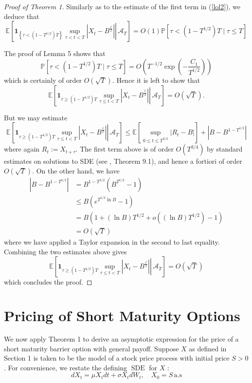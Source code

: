 \documentclass{article}
\theoremstyle{definition}
\theoremstyle{definition}
\begin{document}
\begin{proof}[Proof of Theorem 1]
Similarly as to the estimate of the first term in (\ref{lol2}), we deduce that
$$
\mathbb{E}\left[\left.\mathbf{1}_{\left\{\tau<\left(1-T^{1 / 2}\right) T\right\}} \sup _{\tau<t<T}\left|X_{t}-B^{\frac{t}{T}}\right| \right\rvert\, \mathcal{A}_{T}\right]=O(1) \mathbb{P}\left[\tau<\left(1-T^{1 / 2}\right) T \mid \tau \leq T\right]
$$

The proof of Lemma 5 shows that
$$
\mathbb{P}\left[\tau<\left(1-T^{1 / 2}\right) T \mid \tau \leq T\right]=O\left(T^{-1 / 2} \exp \left(-\frac{C_{1}}{T^{1 / 2}}\right)\right)
$$
which is certainly of order $O(\sqrt{T})$. Hence it is left to show that
$$
\mathbb{E}\left[\left.\mathbf{1}_{\tau \geq\left(1-T^{1 / 2}\right) T} \sup _{\tau \leq t<T}\left|X_{t}-B^{\frac{t}{T}}\right| \right\rvert\, \mathcal{A}_{T}\right]=O(\sqrt{T}) .
$$

But we may estimate
$$
\mathbb{E}\left[\left.\mathbf{1}_{\tau \geq\left(1-T^{1 / 2}\right) T} \sup _{\tau \leq t<T}\left|X_{t}-B^{\frac{t}{T}}\right| \right\rvert\, \mathcal{A}_{T}\right] \leq \mathbb{E}\left[\sup _{0 \leq t \leq T^{3 / 2}}\left|R_{t}-B\right|\right]+\left|B-B^{1-T^{1 / 2}}\right|
$$
where again $R_{t}:=X_{t+\tau}$. The first term above is of order $O\left(T^{3 / 4}\right)$ by standard estimates on solutions to SDE (see \cite{baldi}, Theorem 9.1), and hence a fortiori of order $O(\sqrt{T})$. On the other hand, we have
$$
\begin{aligned}
\left|B-B^{1-T^{1 / 2}}\right| & =B^{1-T^{1 / 2}}\left(B^{T^{1 / 2}}-1\right) \\
& \leq B\left(e^{T^{1 / 2} \ln B}-1\right) \\
& =B\left(1+(\ln B) T^{1 / 2}+o\left((\ln B) T^{1 / 2}\right)-1\right) \\
& =O(\sqrt{T})
\end{aligned}
$$
where we have applied a Taylor expansion in the second to last equality. Combining the two estimates above gives
$$
\mathbb{E}\left[\left.\mathbf{1}_{\tau \geq\left(1-T^{1 / 2}\right) T} \sup _{\tau \leq t<T}\left|X_{t}-B^{\frac{t}{T}}\right| \right\rvert\, \mathcal{A}_{T}\right]=O(\sqrt{T})
$$
which concludes the proof.
\end{proof}
\section{Pricing of Short Maturity Options}

We now apply Theorem 1 to derive an asymptotic expression for the price of a short maturity barrier option with general payoff. Suppose $X$ as defined in Section 1 is taken to be the model of a stock price process with initial price $S > 0$. For convenience, we restate the defining $\operatorname{SDE}$ for $X$ :
$$
d X_{t}=\mu X_{t} d t+\sigma X_{t} d W_{t}, \quad X_{0}= S \, \mathrm{a} . \mathrm{s}
$$
\end{document}
